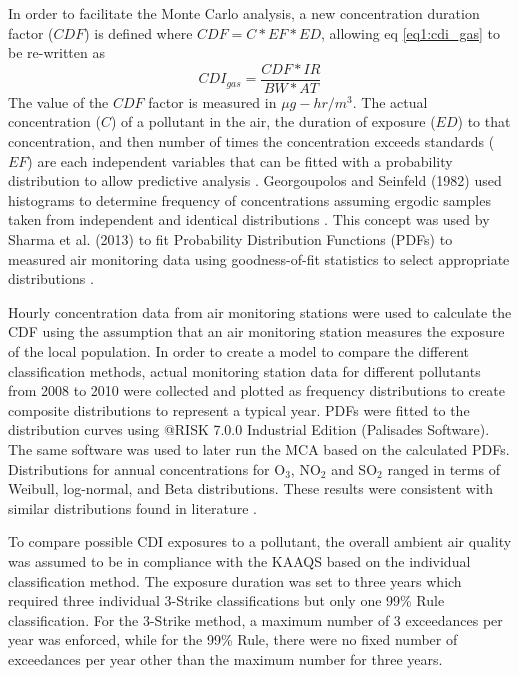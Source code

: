 In order to facilitate the Monte Carlo analysis, a new concentration duration factor ($CDF$) is defined where $CDF = C*EF*ED$, allowing eq \ref{eq1:cdi_gas} to be re-written as
%
\begin{equation}
\label{eq2:cdf_gas}
CDI_{gas} = \frac{CDF*IR}{BW*AT}
\end{equation}
%
The value of the $CDF$ factor is measured in $\mu g-hr/m^{3}$. The actual concentration ($C$) of a pollutant in the air, the duration of exposure ($ED$) to that concentration, and then number of times the concentration exceeds standards ($EF$) are each independent variables  that can be fitted with a probability distribution to allow predictive analysis \citep{Lonati2011}. Georgoupolos and Seinfeld (1982) used histograms to determine frequency of concentrations assuming ergodic samples taken from independent and identical distributions \citep{Georgopoulos1982}. This concept was used by Sharma et al. (2013) to fit Probability Distribution Functions (PDFs) to measured air monitoring data using goodness-of-fit statistics to select appropriate distributions \citep{Sharma2013}. 

Hourly concentration data from air monitoring stations were used to calculate the CDF using the assumption that an air monitoring station measures the exposure of the local population.  In order to create a model to compare the different classification methods, actual monitoring station data for different pollutants from 2008 to 2010 were collected and plotted as frequency distributions to create composite distributions to represent a typical year. PDFs were fitted to the distribution curves using @RISK 7.0.0 Industrial Edition (Palisades Software). The same software was used to later run the MCA based on the calculated PDFs. Distributions for annual concentrations for O$_{3}$, NO$_{2}$ and SO$_{2}$ ranged in terms of Weibull, log-normal, and Beta distributions. These results were consistent with similar distributions found in literature \citep{Lu2003, Morel1999, Noor2011}.

To compare possible CDI exposures to a pollutant, the overall ambient air quality was assumed to be in compliance with the KAAQS based on the individual classification method. The exposure duration was set to three years which required three individual 3-Strike classifications but only one 99\% Rule classification. For the 3-Strike method, a maximum number of 3 exceedances per year was enforced, while for the 99\% Rule, there were no fixed number of exceedances per year other than the maximum number for three years.

